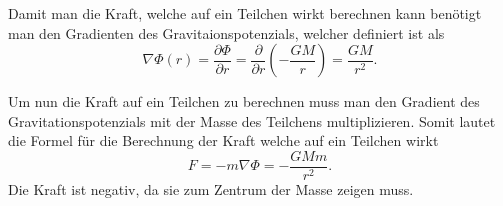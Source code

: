 Damit man die Kraft, welche auf ein Teilchen wirkt berechnen kann benötigt man den Gradienten des Gravitaionspotenzials, welcher definiert ist als
\begin{equation*}
	\nabla \Phi (r) = \frac{\partial \Phi}{\partial r} = \frac{\partial}{\partial r} (-\frac{GM}{r}) = \frac{GM}{r^2}.
\end{equation*}

Um nun die Kraft auf ein Teilchen zu berechnen muss man den Gradient des Gravitationspotenzials mit der Masse des Teilchens multiplizieren.
Somit lautet die Formel für die Berechnung der Kraft welche auf ein Teilchen wirkt
\begin{equation*}
	F = -m\nabla \Phi = -\frac{GMm}{r^2}.
\end{equation*}
Die Kraft ist negativ, da sie zum Zentrum der Masse zeigen muss.


